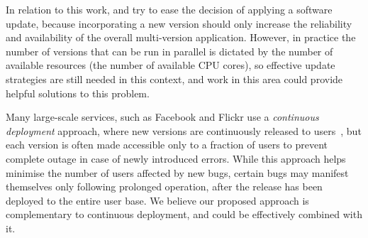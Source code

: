 
In relation to this work, \mx and \varan try to ease the decision of applying a
software update, because incorporating a new version should only increase the
reliability and availability of the overall multi-version
application.  However, in practice the number of versions that can be run in
parallel is dictated by the number of available resources (\eg the number of
available CPU cores), so effective update strategies are still needed in this
context, and work in this area could provide helpful solutions to this problem.


Many large-scale services, such as Facebook and Flickr use a {\it continuous
deployment} approach, where new versions are continuously released to
users~\cite{johnson2009,flickr}, but each version is often made accessible only
to a fraction of users to prevent complete outage in case of newly introduced
errors.  While this approach helps minimise the number of users affected by new
bugs, certain bugs may manifest themselves only following prolonged operation,
after the release has been deployed to the entire user base.  We believe our
proposed approach is complementary to continuous deployment, and could be
effectively combined with it.
